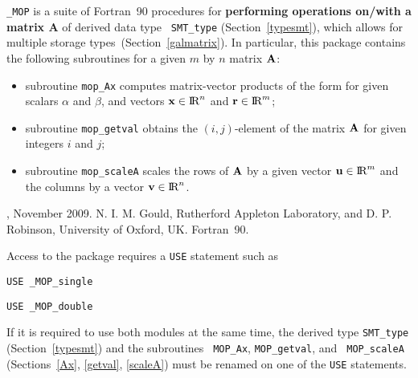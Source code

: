 \documentclass{galahad}
\newcommand{\packagename}{MOP}
\newcommand{\fullpackagename}{\libraryname\_\packagename}
\begin{document}
\galheader


\galsummary

{\tt \fullpackagename} is a suite of Fortran~90 procedures for
{\bf performing operations on/with a matrix $\mathbf{A}$} of derived data type {\tt
  SMT\_type} (Section~\ref{typesmt}), which allows for multiple storage
types~(Section~\ref{galmatrix}).  In particular, this package contains the following
subroutines for a given $m$ by $n$ matrix ${\mathbf{A}}$:
\begin{itemize}
  \item subroutine {\tt mop\_Ax} computes matrix-vector products of
    the form
    for given scalars $\alpha$ and $\beta$, and vectors ${\mathbf{x}}
    \in \hbox{I\hskip -1.5pt R}^n$ and ${\mathbf{r}} \in \hbox{I\hskip -1.5pt R}^m$;
  \item subroutine {\tt mop\_getval} obtains the $(i,j)$-element of
    the matrix ${\mathbf{A}}$ for given integers $i$ and $j$;
  \item subroutine {\tt mop\_scaleA} scales the rows of ${\mathbf{A}}$ by a
    given vector ${\mathbf{u}}\in\hbox{I\hskip -1.5pt R}^m$ and the columns by a vector ${\mathbf{v}}\in\hbox{I\hskip -1.5pt R}^n$.
\end{itemize}


\galattributes
\galversions{\tt  \fullpackagename\_single, \fullpackagename\_double},
\galdate November 2009.
\galorigin N. I. M. Gould, Rutherford Appleton Laboratory, and
D. P. Robinson, University of Oxford, UK.
\gallanguage Fortran~90. 


\galhowto

Access to the package requires a {\tt USE} statement such as

\medskip{}

\hspace{8mm} {\tt USE \fullpackagename\_single}

\medskip{}

\hspace{8mm} {\tt USE  \fullpackagename\_double}

\medskip

If it is required to use both modules at the same time, the derived
type {\tt SMT\_type} (Section~\ref{typesmt}) and the subroutines {\tt
  \packagename\_Ax}, {\tt \packagename\_getval}, and {\tt
  \packagename\_scaleA} (Sections~\ref{Ax}, \ref{getval},
\ref{scaleA}) must be renamed on one of the {\tt USE} statements.
\end{document}
